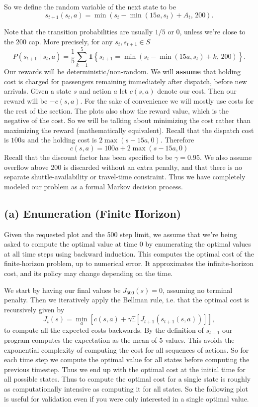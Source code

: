 \documentclass{article}
\begin{document}
So we define the random variable of the next state to be
\[
s_{t+1}(s_t,a)
=
\min\left(s_t-\min(15a,s_t)+A_t,\,200\right).
\]

Note that the transition probabilities are usually $1/5$ or $0$, unless we're close to the 200 cap.
More precisely, for any $s_t, s_{t+1}\in S$
\[
P(s_{t+1}\mid s_t,a)
=
\frac{1}{5}
\sum_{k=1}^{5}
\mathbf{1}
\left\{
s_{t+1}
=
\min\left(s_t-\min(15a,s_t)+k,\,200\right)
\right\}.
\]
Our rewards will be deterministic/non-random. We will \textbf{assume} that holding cost is charged for passengers remaining immediately after dispatch, before new arrivals. Given a state $s$ and action $a$ let $c(s,a)$ denote our cost. Then our reward will be $-c(s,a)$. For the sake of convenience we will mostly use costs for the rest of the section. The plots also show the reward value, which is the negative of the cost. So we will be talking about minimizing the cost rather than maximizing the reward (mathematically equivalent). Recall that the dispatch cost is $100a$ and the holding cost is $2\max(s-15a,0)$. Therefore
\[c(s,a) = 100a + 2\max(s-15a,0) \]
Recall that the discount factor has been specified to be $\gamma = 0.95$. We also assume overflow above 200 is discarded without an extra penalty, and that there is no separate shuttle-availability or travel-time constraint. Thus we have completely modeled our problem as a formal Markov decision process.

\subsection{(a) Enumeration (Finite Horizon)}
Given the requested plot and the 500 step limit, we assume that we're being asked to compute the optimal value at time 0 by enumerating the optimal values at all time steps using backward induction. This computes the optimal cost of the finite-horizon problem, up to numerical error. It approximates the infinite-horizon cost, and its policy may change depending on the time. 

We start by having our final values be $J_{500}(s)=0$, assuming no terminal penalty. Then we iteratively apply the Bellman rule, i.e. that the optimal cost is recursively given by
\[J_t(s) = \min_a \left[c(s,a)+\gamma\mathbb{E}\!\left[J_{t+1}(s_{t+1}(s,a))\right]\right],\]
to compute all the expected costs backwards. By the definition of $s_{t+1}$ our program computes the expectation as the mean of 5 values. This avoids the exponential complexity of computing the cost for all sequences of actions. So for each time step we compute the optimal value for all states before computing the previous timestep. Thus we end up with the optimal cost at the initial time for all possible states. Thus to compute the optimal cost for a single state is roughly as computationally intensive as computing it for all states. So the following plot is useful for validation even if you were only interested in a single optimal value.
\end{document}
